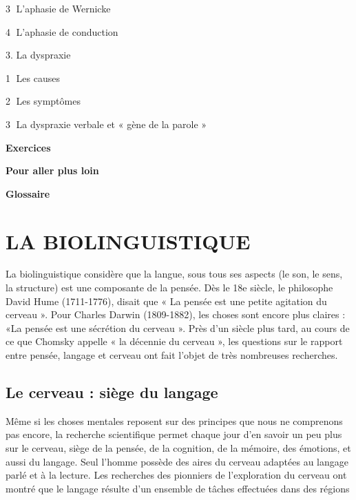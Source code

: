 \begin{keybox}
\hspace*{2em}\textcircled{\scriptsize 3} L’aphasie de Wernicke\par
\hspace*{2em}\textcircled{\scriptsize 4} L’aphasie de conduction\par
\hspace*{1em}3. La dyspraxie\par
\hspace*{2em}\textcircled{\scriptsize 1} Les causes\par
\hspace*{2em}\textcircled{\scriptsize 2} Les symptômes\par
\hspace*{2em}\textcircled{\scriptsize 3} La dyspraxie verbale et « gène de la parole »\par
\textbf{Exercices}\par\textbf{Pour aller plus loin}\par\textbf{Glossaire}
\end{keybox}



\section{LA BIOLINGUISTIQUE}
La biolinguistique considère que la langue, sous tous ses aspects (le son, le sens, la structure) est une
composante de la pensée. Dès le 18e siècle, le philosophe David Hume (1711-1776), disait que « La pensée
est une petite agitation du cerveau ». Pour Charles Darwin (1809-1882), les choses sont encore plus claires :
«La pensée est une sécrétion du cerveau ». Près d’un siècle plus tard, au cours de ce que Chomsky appelle
« la décennie du cerveau », les questions sur le rapport entre pensée, langage et cerveau ont fait l’objet de très
nombreuses recherches.
\subsection{Le cerveau : siège du langage}
Même si les choses mentales reposent sur des principes que nous ne comprenons pas encore, la
recherche scientifique permet chaque jour d’en savoir un peu plus sur le cerveau, siège de la pensée,
de la cognition, de la mémoire, des émotions, et aussi du langage. Seul l’homme possède des aires
du cerveau adaptées au langage parlé et à la lecture. Les recherches des pionniers de l’exploration
du cerveau ont montré que le langage résulte d’un ensemble de tâches effectuées dans des régions

